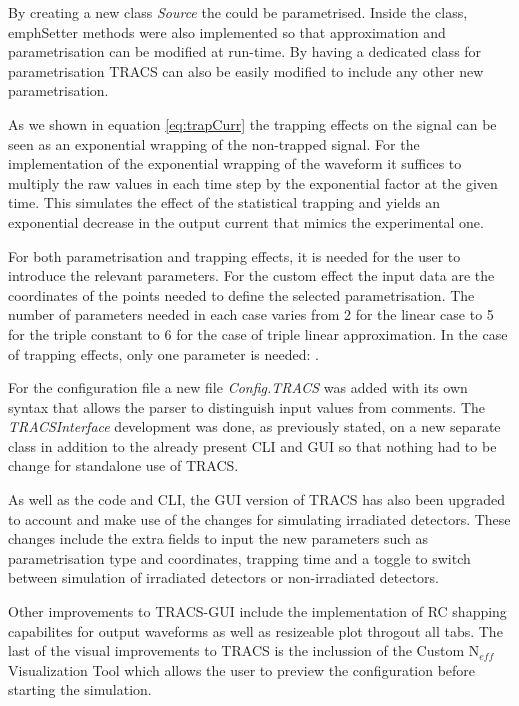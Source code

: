 By creating a new class \textit{Source} the \neff could be parametrised. Inside the class, emph{Setter} methods were also implemented so that \neff approximation and parametrisation can be modified at run-time. By having a dedicated class for \neff parametrisation TRACS can also be easily modified to include any other new parametrisation. 

As we shown in equation \ref{eq:trapCurr} the trapping effects on the signal can be seen as an exponential wrapping of the non-trapped signal. For the implementation of the exponential wrapping of the waveform it suffices to multiply the raw values in each time step by the exponential factor at the given time. This simulates the effect of the statistical trapping and yields an exponential decrease in the output current that mimics the experimental one.

For both \neff parametrisation and trapping effects, it is needed for the user to introduce the relevant parameters. For the custom \neff effect the input data are the coordinates of the points needed to define the selected \neff parametrisation. The number of parameters needed in each case varies from 2 for the linear case to 5 for the triple constant \neff to 6 for the case of triple linear approximation. In the case of trapping effects, only one parameter is needed: \tau.

For the configuration file a new file \textit{Config.TRACS} was added with its own syntax that allows the parser to distinguish input values from comments. The \textit{TRACSInterface} development was done, as previously stated, on a new separate class in addition to the already present CLI and GUI so that nothing had to be change for standalone use of TRACS.

As well as the code and CLI, the GUI version of TRACS has also been upgraded to account and make use of the changes for simulating irradiated detectors. These changes include the extra fields to input the new parameters such as \neff parametrisation type and coordinates, trapping time and a toggle to switch between simulation of irradiated detectors or non-irradiated detectors. 

Other improvements to TRACS-GUI include the implementation of RC shapping capabilites for output waveforms as well as resizeable plot throgout all tabs. The last of the visual improvements to TRACS is the inclussion of the Custom N$_{eff}$ Visualization Tool which allows the user to preview the \neff configuration before starting the simulation.

